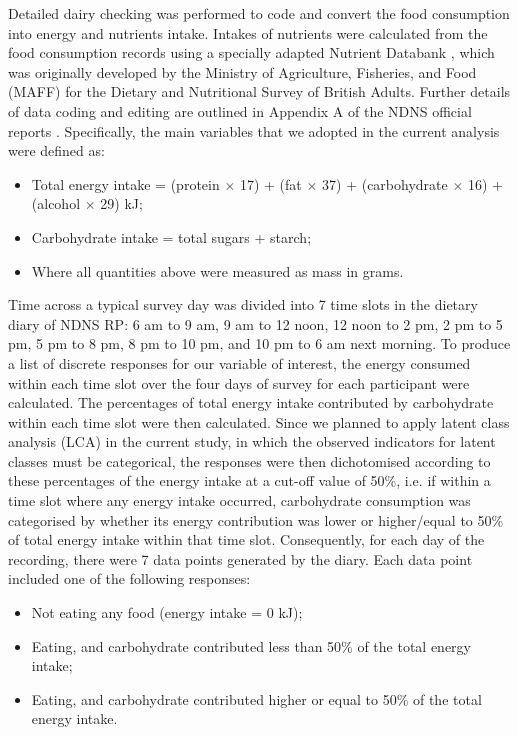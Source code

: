 Detailed dairy checking was performed to code and convert the food consumption into energy and nutrients intake. Intakes of nutrients were calculated from the food consumption records using a specially adapted Nutrient Databank \parencite{smithers1993maff}, which was originally developed by the Ministry of Agriculture, Fisheries, and Food (MAFF) for the Dietary and Nutritional Survey of British Adults. Further details of data
coding and editing are outlined in Appendix A of the NDNS official reports \parencite{NDNSofficial}. Specifically, the main variables that we adopted in the current analysis were defined as: 

\begin{itemize}
	\item Total energy intake = (protein $\times$ 17) + (fat $\times$ 37) + (carbohydrate $\times$ 16) + (alcohol $\times$ 29)  kJ;
	\item Carbohydrate intake = total sugars + starch; 
	\item Where all quantities above were measured as mass in grams.
\end{itemize}

Time across a typical survey day was divided into 7 time slots in the dietary diary of NDNS RP: 6 am to 9 am, 9 am to 12 noon, 12 noon to 2 pm, 2 pm to 5 pm, 5 pm to 8 pm, 8 pm to 10 pm, and 10 pm to 6 am next morning. To produce a list of discrete responses for our variable of interest, the energy consumed within each time slot over the four days of survey for each participant were calculated. The percentages of total energy intake contributed by carbohydrate within each time slot were then calculated. Since we planned to apply latent class analysis (LCA) in the current study, in which the observed indicators for latent classes must be categorical, the responses were then dichotomised according to these percentages of the energy intake at a cut-off value of 50\%, i.e. if within a time slot where any energy intake occurred, carbohydrate consumption was categorised by whether its energy contribution was lower or higher/equal to 50\% of total energy intake within that time slot. Consequently, for each day of the recording, there were 7 data points generated by the diary. Each data point included one of the following responses:

\begin{itemize}
	\item Not eating any food (energy intake = 0 kJ); 
	\item Eating, and carbohydrate contributed less than 50\% of the total energy intake;
	\item Eating, and carbohydrate contributed higher or equal to 50\% of the total energy intake.
\end{itemize}
\vspace{-0.5cm}


